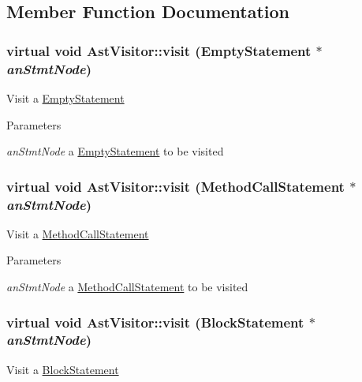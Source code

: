 \subsection{Member Function Documentation}
\hypertarget{classAstVisitor_ae4a605acd038f5983b70edb8f1d51ea2}{
\subsubsection[{visit}]{\setlength{\rightskip}{0pt plus 5cm}virtual void AstVisitor::visit ({\bf EmptyStatement} $\ast$ {\em anStmtNode})}}
\label{classAstVisitor_ae4a605acd038f5983b70edb8f1d51ea2}
Visit a \hyperlink{classEmptyStatement}{EmptyStatement}


\begin{DoxyParams}{Parameters}
\item[{\em anStmtNode}]a \hyperlink{classEmptyStatement}{EmptyStatement} to be visited \end{DoxyParams}
\hypertarget{classAstVisitor_a157fd3ed798acf5a3694bb045a4e83c5}{
\subsubsection[{visit}]{\setlength{\rightskip}{0pt plus 5cm}virtual void AstVisitor::visit ({\bf MethodCallStatement} $\ast$ {\em anStmtNode})}}
\label{classAstVisitor_a157fd3ed798acf5a3694bb045a4e83c5}
Visit a \hyperlink{classMethodCallStatement}{MethodCallStatement}


\begin{DoxyParams}{Parameters}
\item[{\em anStmtNode}]a \hyperlink{classMethodCallStatement}{MethodCallStatement} to be visited \end{DoxyParams}
\hypertarget{classAstVisitor_a5599e57d09e99f818cc1e1b484e1616a}{
\subsubsection[{visit}]{\setlength{\rightskip}{0pt plus 5cm}virtual void AstVisitor::visit ({\bf BlockStatement} $\ast$ {\em anStmtNode})}}
\label{classAstVisitor_a5599e57d09e99f818cc1e1b484e1616a}
Visit a \hyperlink{classBlockStatement}{BlockStatement}


